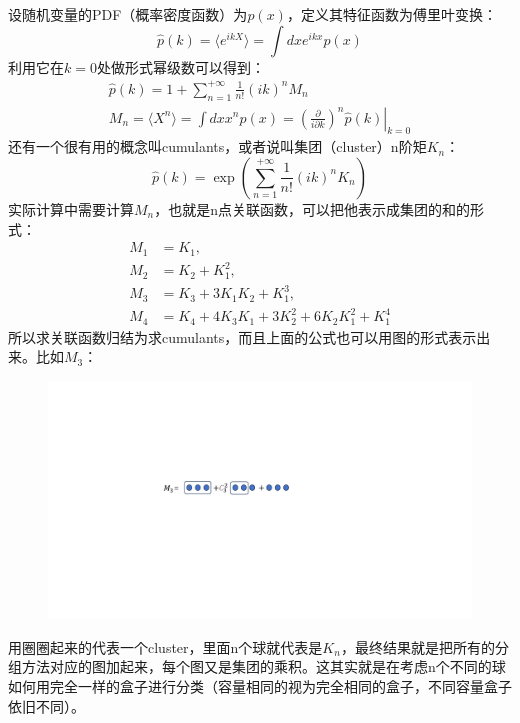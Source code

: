 设随机变量的PDF（概率密度函数）为$p(x)$，定义其特征函数为傅里叶变换：
\begin{equation}
	\widehat{p}(k)=\langle e^{ikX}\rangle=\int dxe^{ikx}p(x)
\end{equation}
利用它在$k=0$处做形式幂级数可以得到：
\begin{equation}
	\begin{gathered}
		\widehat{p}(k)=1+\sum_{n=1}^{+\infty}\frac1{n!}(ik)^nM_n\\
		M_n=\langle X^n\rangle=\int dxx^np(x)=\left.\left(\frac{\partial}{i\partial k}\right)^n\widehat{p}(k)\right|_{k=0}
	\end{gathered}
\end{equation}
还有一个很有用的概念叫cumulants，或者说叫集团（cluster）n阶矩$K_n$：
\begin{equation}
	\widehat{p}(k)=\exp\left(\sum_{n=1}^{+\infty}\frac1{n!}(ik)^nK_n\right)
\end{equation}
实际计算中需要计算$M_n$，也就是n点关联函数，可以把他表示成集团的和的形式：
\begin{equation}
	\begin{aligned}M_1&=K_1,\\M_2&=K_2+K_1^2,\\M_3&=K_3+3K_1K_2+K_1^3,\\M_4&=K_4+4K_3K_1+3K_2^2+6K_2K_1^2+K_1^4\end{aligned}
\end{equation}
所以求关联函数归结为求cumulants，而且上面的公式也可以用图的形式表示出来。比如$M_3$：
\begin{figure}[H]
	\centering
	\includegraphics{figs/fig1.pdf}
\end{figure}
用圈圈起来的代表一个cluster，里面n个球就代表是$K_n$，最终结果就是把所有的分组方法对应的图加起来，每个图又是集团的乘积。这其实就是在考虑n个不同的球如何用完全一样的盒子进行分类（容量相同的视为完全相同的盒子，不同容量盒子依旧不同）。


